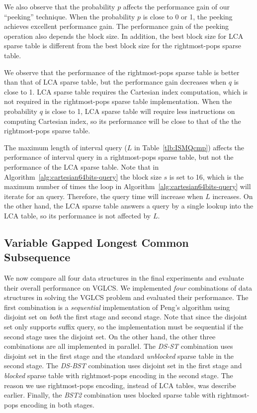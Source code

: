 

We also observe that the probability $p$ affects the performance gain
of our ``peeking'' technique.  When the probability $p$ is close to 0
or 1, the peeking achieves excellent performance gain.  The
performance gain of the peeking operation also depends the block size.
In addition, the best block size for LCA sparse table is different
from the best block size for the rightmost-pops sparse table.

We observe that the performance of the rightmost-pops sparse table is
better than that of LCA sparse table, but the performance gain
decreases when $q$ is close to 1.  LCA sparse table requires the
Cartesian index computation, which is not required in the
rightmost-pops sparse table implementation.  When the probability $q$
is close to 1, LCA sparse table will require less instructions on
computing Cartesian index, so its performance will be close to that of
the the rightmost-pops sparse table.

The maximum length of interval query ($L$ in Table~\ref{tlb:ISMQcmp})
affects the performance of interval query in a rightmost-pops sparse
table, but not the performance of the LCA sparse table.  Note that in
Algorithm~\ref{alg:cartesian64bits-query} the block size $s$ is set to
16, which is the maximum number of times the loop in
Algorithm~\ref{alg:cartesian64bits-query} will iterate for an query.
Therefore, the query time will increase when $L$ increases.  On the
other hand, the LCA sparse table answers a query by a single lookup
into the LCA table, so its performance is not affected by $L$.

\subsection{Variable Gapped Longest Common Subsequence}

We now compare all four data structures in the final experiments and
evaluate their overall performance on VGLCS.  We implemented {\em
  four} combinations of data structures in solving the VGLCS problem
and evaluated their performance.  The first combination is a {\em
  sequential} implementation of Peng's algorithm using disjoint set on
{\em both} the first stage and second stage.  Note that since the
disjoint set only supports suffix query, so the implementation must be
sequential if the second stage uses the disjoint set.  On the other
hand, the other three combinations are all implemented in
parallel. The {\em DS-ST} combination uses disjoint set in the first
stage and the standard {\em unblocked} sparse table in the second
stage.  The {\em DS-BST} combination uses disjoint set in the first
stage and {\em blocked} sparse table with rightmost-pops encoding in
the second stage.  The reason we use rightmost-pops encoding, instead
of LCA tables, was describe earlier.  Finally, the {\em BST2}
combination uses blocked sparse table with rightmost-pops encoding in
both stages.

